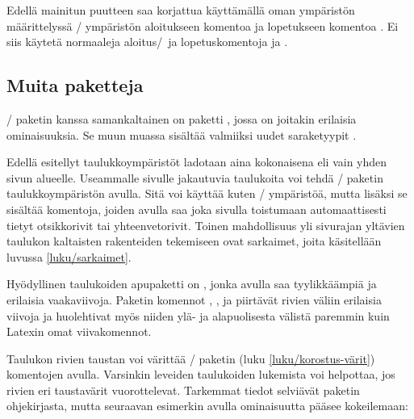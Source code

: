 \noindent
Edellä mainitun puutteen saa korjattua käyttämällä oman ympäristön
määrittelyssä \-/ ympäristön aloitukseen komentoa
 ja lopetukseen komentoa . Ei
siis käytetä normaaleja aloitus\-/\ ja lopetuskomentoja 
ja .

\begin{koodilohkosis}
\newenvironment{omataulukko}[1]
{\tabularx{\linewidth}{#1}}
{\endtabularx}
\end{koodilohkosis}

\subsection{Muita paketteja}

\-/ paketin kanssa samankaltainen on paketti
, jossa on joitakin erilaisia ominaisuuksia. Se
muun muassa sisältää valmiiksi uudet saraketyypit .

Edellä esitellyt taulukkoympäristöt ladotaan aina kokonaisena eli vain
yhden sivun alueelle. Useammalle sivulle jakautuvia taulukoita voi tehdä
\-/ paketin taulukkoympäristön
 avulla. Sitä voi käyttää kuten
\-/ ympäristöä, mutta lisäksi se sisältää komentoja,
joiden avulla saa joka sivulla toistumaan automaattisesti tietyt
otsikkorivit tai yhteenvetorivit. Toinen mahdollisuus yli sivurajan
yltävien taulukon kaltaisten rakenteiden tekemiseen ovat sarkaimet,
joita käsitellään luvussa \ref{luku/sarkaimet}.

Hyödyllinen taulukoiden apupaketti on , jonka
avulla saa tyylikkäämpiä ja erilaisia vaakaviivoja. Paketin komennot
, ,  ja
 piirtävät rivien väliin erilaisia viivoja ja
huolehtivat myös niiden ylä- ja alapuolisesta välistä paremmin kuin
Latexin omat viivakomennot.

Taulukon rivien taustan voi värittää \-/ paketin
(luku \ref{luku/korostus-värit}) komentojen avulla. Varsinkin leveiden
taulukoiden lukemista voi helpottaa, jos rivien eri taustavärit
vuorottelevat. Tarkemmat tiedot selviävät paketin ohjekirjasta, mutta
seuraavan esimerkin avulla ominaisuutta pääsee kokeilemaan:

\begin{koodilohkosis}
\usepackage[table]{xcolor}     %
\end{koodilohkosis}

